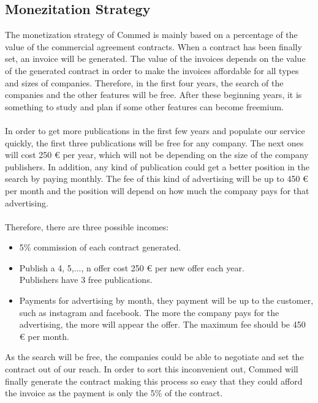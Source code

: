 
\let\texteuro\euro
\subsection{Monezitation Strategy}
The monetization strategy of Commed is mainly based on a percentage of the value of the commercial agreement contracts. When a contract has been finally set, an invoice will be generated. The value of the invoices depends on the value of the generated contract in order to make the invoices affordable for all types and sizes of companies. Therefore, in the first four years, the search of the companies and the other features will be free. After these beginning years, it is something to study and plan if some other features can become freemium.
\\
\\
In order to get more publications in the first few years and populate our service quickly, the first three publications will be free for any company. The next ones will cost 250 € per year, which will not be depending on the size of the company publishers.
In addition, any kind of publication could get a better position in the search by paying monthly. The fee of this kind of advertising will be up to 450 € per month and the position will depend on how much the company pays for that advertising.
\\
\\
Therefore, there are three possible incomes:
\begin{itemize}
	\item 5\% commission of each contract generated.
	\item Publish a 4, 5,..., n offer cost 250 € per new offer each year. \\Publishers have 3 free publications.
	\item Payments for advertising by month, they payment will be up to the customer, such as instagram and facebook. The more the company pays for the advertising, the more will appear the offer. The maximum fee should be 450 € per month.
\end{itemize}
As the search will be free, the companies could be able to negotiate and set the contract out of our reach. In order to sort this inconvenient out, Commed will finally generate the contract making this process so easy that they could afford the invoice as the payment is only the 5\% of the contract.
